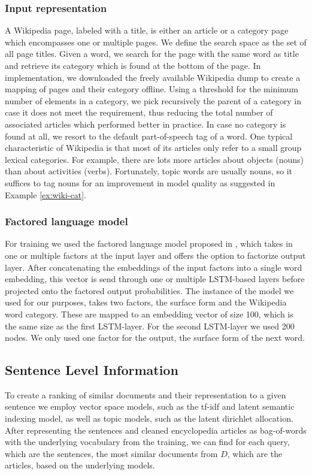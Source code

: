 \documentclass[a4paper]{article}
\begin{document}
\subsubsection{Input representation}
A Wikipedia page, labeled with a title, is either an article or a category page which encompasses one or multiple pages.
We define the search space as the set of all page titles. Given a word, we search for the page with the same word as title and retrieve its category which is found at the bottom of the page.
In implementation, we downloaded the freely available Wikipedia dump to create a mapping of pages and their category offline. Using a threshold for the minimum number of elements in a category, we pick recursively the parent of a category in case it does not meet the requirement, thus reducing the total number of associated articles which performed better in practice. In case no category is found at all, we resort to the default part-of-speech tag of a word.
One typical characteristic of Wikipedia is that most of its articles only refer to a small group lexical categories. For example, there are lots more articles about objects (nouns) than about activities (verbs). Fortunately, topic words are usually nouns, so it suffices to tag nouns for an improvement in model quality as suggested in  Example \ref{ex:wiki-cat}.

\subsubsection{Factored language model}
For training we used the factored language model proposed in \cite{niehuesusing}, which takes in one or multiple factors at the input layer and offers the option to factorize output layer. After concatenating the embeddings of the input factors into a single word embedding, this vector is send through one or multiple LSTM-based layers before projected onto the factored output probabilities. The instance of the model we used for our purposes, takes two factors, the surface form and the Wikipedia word category. These are mapped to an embedding vector of size 100, which is the same size as the first LSTM-layer. For the second LSTM-layer we used 200 nodes. We only used one factor for the output, the surface form of the next word.


\subsection{Sentence Level Information} \label{sec:sentence-level}
To create a ranking of similar documents and their representation to a given sentence we employ vector space models, such as the tf-idf and latent semantic indexing model, as well as topic models, such as the latent dirichlet allocation. After representing the sentences and cleaned encyclopedia articles as bag-of-words with the underlying vocabulary from the training, we can find for each query, which are the sentences, the most similar documents from $D$, which are the articles,  based on the underlying models.
\end{document}
